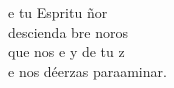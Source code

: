 \begin{cancion}%
	e tu Espritu ñor\\
	descienda bre noros    \\
	que nos e y de tu z  \\
	e nos déerzas paraaminar.\\
\end{cancion}%
